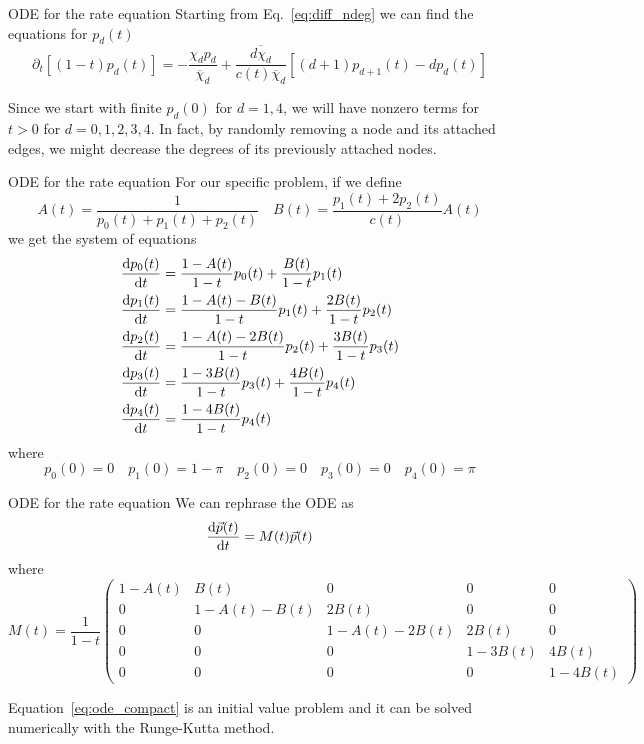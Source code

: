 \documentclass[handout]{beamer}
\begin{document}
\begin{frame}{ODE for the rate equation}
    Starting from Eq.~\ref{eq:diff_ndeg} we can find the equations for $p_d(t)$
    \begin{equation}
        \partial_t[(1-t) p_d(t)] = - \frac{\chi_d p_d}{\overline \chi_d}
        + \frac{\overline{d \chi_d}}{c(t) \overline \chi_d}
        [(d+1) p_{d+1}(t) - d p_d(t)]
        \label{eq:wormwald_ode}
    \end{equation}
    
    Since we \alert{start} with finite $p_d(0)$ for $d=1,4$, we will have
    nonzero terms for $t>0$ for $d=0,1,2,3,4$. In fact, by randomly removing a
    node and its attached edges, we might decrease the degrees of its previously
    attached nodes.
\end{frame}

\begin{frame}{ODE for the rate equation}
    For our specific problem, if we define
    $$
    A(t) = \frac{1}{p_0(t) + p_1(t) + p_2(t)}
    \quad B(t) = \frac{p_1(t) + 2 p_2(t)}{c(t)} A(t)
    $$
    we get the system of equations
    {\scriptsize
    \begin{align*}
        \dv{p_0(t)}{t} &= \frac{1-A(t)}{1-t} p_0(t) + \frac{B(t)}{1-t} p_1(t)\\
        \dv{p_1(t)}{t} &= \frac{1-A(t)-B(t)}{1-t} p_1(t) + \frac{2B(t)}{1-t} p_2(t)\\
        \dv{p_2(t)}{t} &= \frac{1-A(t)-2B(t)}{1-t} p_2(t) + \frac{3B(t)}{1-t}
        p_3(t)\\
        \dv{p_3(t)}{t} &= \frac{1-3B(t)}{1-t} p_3(t) + \frac{4B(t)}{1-t} p_4(t)\\
        \dv{p_4(t)}{t} &= \frac{1-4B(t)}{1-t} p_4(t)
    \end{align*}
    where
    $$
    p_0(0) = 0 \quad p_1(0) = 1-\pi \quad p_2(0)=0 \quad p_3(0)=0 \quad
    p_4(0)=\pi
    $$
    }
\end{frame}

\begin{frame}{ODE for the rate equation}
    We can rephrase the ODE as
    \begin{equation}
        \dv{\vec p(t)}{t} = M(t) \vec p(t)
        \label{eq:ode_compact}
    \end{equation}
    where
    {\scriptsize
    $$
    M(t) = \frac{1}{1-t}
    \begin{pmatrix}
        1-A(t) & B(t) & 0 & 0 & 0\\
        0 & 1-A(t)-B(t) & 2B(t) & 0 & 0\\
        0 & 0 & 1-A(t)-2B(t) & 2B(t) & 0\\
        0 & 0 & 0 & 1-3B(t) & 4B(t)\\
        0 & 0 & 0 & 0 & 1-4B(t)
    \end{pmatrix}
    $$
    }

    Equation~\ref{eq:ode_compact} is an initial value problem and it can be
    solved numerically with the \alert{Runge-Kutta} method.
\end{frame}
\end{document}
